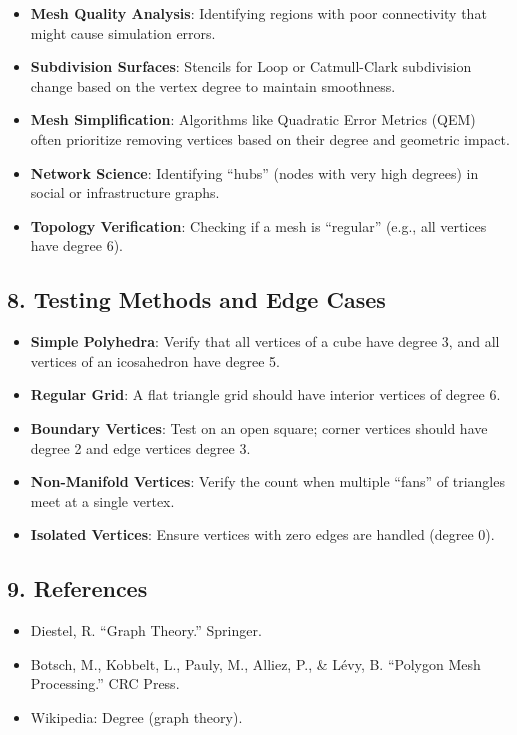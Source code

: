 \begin{itemize}
    \item \textbf{Mesh Quality Analysis}: Identifying regions with poor connectivity that might cause simulation errors.
    \item \textbf{Subdivision Surfaces}: Stencils for Loop\cite{loop1987} or Catmull-Clark\cite{catmull1978} subdivision change based on the vertex degree to maintain smoothness.
    \item \textbf{Mesh Simplification}: Algorithms like Quadratic Error Metrics (QEM) often prioritize removing vertices based on their degree and geometric impact.
    \item \textbf{Network Science}: Identifying ``hubs'' (nodes with very high degrees) in social or infrastructure graphs.
    \item \textbf{Topology Verification}: Checking if a mesh is ``regular'' (e.g., all vertices have degree 6).
\end{itemize}

\subsection{8. Testing Methods and Edge Cases}

\begin{itemize}
    \item \textbf{Simple Polyhedra}: Verify that all vertices of a cube have degree 3, and all vertices of an icosahedron have degree 5.
    \item \textbf{Regular Grid}: A flat triangle grid should have interior vertices of degree 6.
    \item \textbf{Boundary Vertices}: Test on an open square; corner vertices should have degree 2 and edge vertices degree 3.
    \item \textbf{Non-Manifold Vertices}: Verify the count when multiple ``fans'' of triangles meet at a single vertex.
    \item \textbf{Isolated Vertices}: Ensure vertices with zero edges are handled (degree 0).
\end{itemize}

\subsection{9. References}

\begin{itemize}
    \item Diestel, R. \cite{diestel2017} ``Graph Theory.'' Springer.
    \item Botsch, M., Kobbelt, L., Pauly, M., Alliez, P., \& L\'evy, B. \cite{botsch2010} ``Polygon Mesh Processing.'' CRC Press.
    \item Wikipedia: Degree (graph theory).
\end{itemize}

